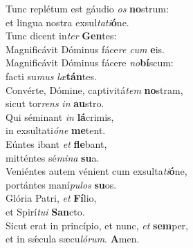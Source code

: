 \evenverse Tunc replétum est gáudio \textit{os} \textbf{no}strum:~\*\\
\evenverse et lingua nostra exsul\textit{ta}\textit{ti}\textbf{ó}ne.\\
\oddverse Tunc dicent in\textit{ter} \textbf{Gen}tes:~\*\\
\oddverse Magnificávit Dóminus fáce\textit{re} \textit{cum} \textbf{e}is.\\
\evenverse Magnificávit Dóminus fácere \textit{no}\textbf{bí}scum:~\*\\
\evenverse facti su\textit{mus} \textit{læ}\textbf{tán}tes.\\
\oddverse Convérte, Dómine, captivitá\textit{tem} \textbf{no}stram,~\*\\
\oddverse sicut tor\textit{rens} \textit{in} \textbf{au}stro.\\
\evenverse Qui séminant \textit{in} \textbf{lá}crimis,~\*\\
\evenverse in exsultati\textit{ó}\textit{ne} \textbf{me}tent.\\
\oddverse Eúntes ibant \textit{et} \textbf{fle}bant,~\*\\
\oddverse mitténtes sé\textit{mi}\textit{na} \textbf{su}a.\\
\evenverse Veniéntes autem vénient cum exsulta\textit{ti}\textbf{ó}ne,~\*\\
\evenverse portántes maní\textit{pu}\textit{los} \textbf{su}os.\\
\oddverse Glória Patri, \textit{et} \textbf{Fí}lio,~\*\\
\oddverse et Spirí\textit{tu}\textit{i} \textbf{San}cto.\\
\evenverse Sicut erat in princípio, et nunc, \textit{et} \textbf{sem}per,~\*\\
\evenverse et in sǽcula sæcu\textit{ló}\textit{rum}. \textbf{A}men.\\
